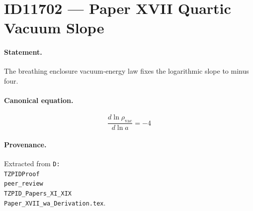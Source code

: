 \section*{ID11702 --- Paper XVII Quartic Vacuum Slope}

\paragraph{Statement.}
The breathing enclosure vacuum-energy law fixes the logarithmic slope to minus four.

\paragraph{Canonical equation.}
\[
\frac{d\ln\rho_{\mathrm{vac}}}{d\ln a}=-4
\]

\paragraph{Provenance.}
Extracted from \texttt{D:\\TZPIDProof\\peer\_review\\TZPID\_Papers\_XI\_XIX\\Paper\_XVII\_wa\_Derivation.tex}.
